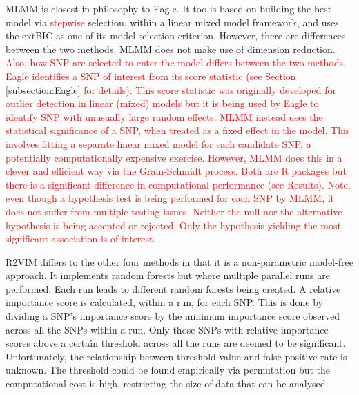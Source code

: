 \documentclass{bioinfo}
\begin{document}
MLMM is closest in philosophy to Eagle. It too is based on building the best model via \textcolor{red}{stepwise} selection, 
within  a linear mixed model framework, and uses the 
extBIC as one of its model selection criterion. However, there are differences between the two methods. 
MLMM does not make use of dimension reduction. \textcolor{red}{Also, how SNP are selected to enter the model differs between the 
two methods. 
Eagle identifies a SNP of interest from its score statistic (see Section \ref{subsection:Eagle} for details).  This score statistic was originally developed for 
outlier detection in linear (mixed) models but it is being used by Eagle to identify 
SNP with unusually large random effects. MLMM instead uses 
the statistical significance of a SNP,  when treated as a fixed effect in the model. This involves fitting a separate linear mixed model for each candidate SNP, a potentially
computationally expensive exercise. However, MLMM does this in a clever and efficient way via the Gram-Schmidt process. 
Both are R packages but there is a significant difference in computational performance (see Results). 
Note, even though a hypothesis test is being performed for each SNP by MLMM, it does not suffer from multiple testing issues. 
Neither the null nor the alternative hypothesis is being accepted or rejected. Only the hypothesis yielding the most significant association is 
of interest. }



  
R2VIM differs to the other four methods in that it is a non-parametric model-free approach. It implements  
random forests but where multiple parallel runs are performed. Each run leads to 
different random forests being created.  A relative importance score is calculated, within a run,  for each SNP. This is done by dividing a SNP's 
importance score by the minimum importance score observed across all the SNPs within a run. 
Only those SNPs with relative importance scores above a certain threshold across all the runs are deemed to be significant. 
Unfortunately, the relationship between threshold value and false positive rate is unknown. The threshold could be found empirically via permutation 
but the computational cost is high, restricting the size of data that can be analysed. 
\end{document}
